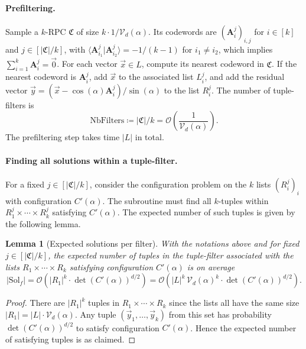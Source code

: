 \documentclass[10pt,a4paper]{article}
\newtheorem{lemma}[theorem]{Lemma}
\begin{document}
\paragraph{Prefiltering.}
Sample a \(k\)-RPC \(\mathfrak{C}\) of size \(k\cdot 1/\mathcal{V}_d(\alpha)\). Its codewords are \((\mathbf{A}_i^j)_{i,j}\) for \(i\in[k]\) and \(j\in[|\mathfrak{C}|/k]\), with \(\langle\mathbf{A}_{i_1}^j|\mathbf{A}_{i_2}^j\rangle=-1/(k-1)\) for \(i_1\neq i_2\), which implies \(\sum_{i=1}^{k}\mathbf{A}_i^j=\vec{0}\). For each vector \(\vec{x}\in L\), compute its nearest codeword in \(\mathfrak{C}\). If the nearest codeword is \(\mathbf{A}_i^j\), add \(\vec{x}\) to the associated list \(L_i^j\), and add the residual vector \(\vec{y}=(\vec{x}-\cos(\alpha)\mathbf{A}_i^j)/\sin(\alpha)\) to the list \(R_i^j\). The number of tuple-filters is
\begin{equation}
\mathrm{NbFilters} \coloneqq |\mathfrak{C}|/k = \mathcal{O}\!\left(\frac{1}{\mathcal{V}_d(\alpha)}\right).
\label{eq:nbfilters}
\end{equation}
The prefiltering step takes time \(|L|\) in total.

\paragraph{Finding all solutions within a tuple-filter.}
For a fixed \(j\in[|\mathfrak{C}|/k]\), consider the configuration problem on the \(k\) lists \((R_i^j)_i\) with configuration \(C'(\alpha)\). The subroutine must find all \(k\)-tuples within \(R_1^j\times\cdots\times R_k^j\) satisfying \(C'(\alpha)\). The expected number of such tuples is given by the following lemma.

\begin{lemma}[Expected solutions per filter]
\label{lem:sol-per-filter}
With the notations above and for fixed \(j\in[|\mathfrak{C}|/k]\), the expected number of tuples in the tuple-filter associated with the lists \(R_1\times\cdots\times R_k\) satisfying configuration \(C'(\alpha)\) is on average
\begin{equation}
|\mathrm{Sol}_f| = \mathcal{O}\!\left(|R_1|^k\cdot\det(C'(\alpha))^{d/2}\right) = \mathcal{O}\!\left(|L|^k\,\mathcal{V}_d(\alpha)^k\cdot\det(C'(\alpha))^{d/2}\right).
\end{equation}
\end{lemma}

\begin{proof}
There are \(|R_1|^k\) tuples in \(R_1\times\cdots\times R_k\) since the lists all have the same size \(|R_1|=|L|\cdot\mathcal{V}_d(\alpha)\). Any tuple \((\vec{y}_1,\ldots,\vec{y}_k)\) from this set has probability \(\det(C'(\alpha))^{d/2}\) to satisfy configuration \(C'(\alpha)\). Hence the expected number of satisfying tuples is as claimed.
\end{proof}
\end{document}
